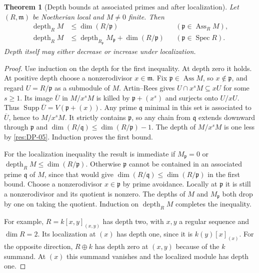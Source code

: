 \documentclass[11pt,oneside,openany]{book}
\newtheorem{theorem}{Theorem}[chapter]
\theoremstyle{definition}
\theoremstyle{remark}
\begin{document}
\begin{theorem}[Depth bounds at associated primes and after localization]
\label{res:DP-10}
Let $(R,\mathfrak m)$ be Noetherian local and $M\ne0$ finite. Then
\[
 \begin{aligned}
 \operatorname{depth}_R M &\le \dim(R/\mathfrak p)
           &&(\mathfrak p\in\operatorname{Ass}_R M),\\
 \operatorname{depth}_R M &\le \operatorname{depth}_{R_{\mathfrak p}}M_{\mathfrak p}
                                      +\dim(R/\mathfrak p)
           &&(\mathfrak p\in\operatorname{Spec}R).
 \end{aligned}
\]
Depth itself may either decrease or increase under localization.
\end{theorem}
\begin{proof}
Use induction on the depth for the first inequality. At depth zero
it holds. At positive depth choose a nonzerodivisor $x\in\mathfrak m$.
Fix $\mathfrak p\in\operatorname{Ass}M$, so $x\notin\mathfrak p$,
and regard $U=R/\mathfrak p$ as a submodule of $M$. Artin--Rees
\cite[Theorem ALG-05-C04-R02]{p103} gives
$U\cap x^s M\subseteq xU$ for some $s\ge1$. Its image
$\overline U$ in $M/x^sM$ is killed by $\mathfrak p+(x^s)$
and surjects onto $U/xU$. Thus
$\operatorname{Supp}\overline U=V(\mathfrak p+(x))$.
Any prime $\mathfrak q$ minimal in this set is associated to
$\overline U$, hence to $M/x^sM$. It strictly contains $\mathfrak p$,
so any chain from $\mathfrak q$ extends downward through
$\mathfrak p$ and $\dim(R/\mathfrak q)\le\dim(R/\mathfrak p)-1$.
The depth of $M/x^sM$ is one less by \ref{res:DP-05}.
Induction proves the first bound.

For the localization inequality the result is immediate if
$M_{\mathfrak p}=0$ or
$\operatorname{depth}_R M\le\dim(R/\mathfrak p)$.
Otherwise $\mathfrak p$ cannot be contained in an associated
prime $\mathfrak q$ of $M$, since that would give
$\dim(R/\mathfrak q)\le\dim(R/\mathfrak p)$ in the first bound.
Choose a nonzerodivisor $x\in\mathfrak p$ by prime avoidance.
Locally at $\mathfrak p$ it is still a nonzerodivisor and its
quotient is nonzero. The depths of $M$ and $M_{\mathfrak p}$
both drop by one on taking the quotient. Induction on
$\operatorname{depth}_R M$ completes the inequality.

For example, $R=k[x,y]_{(x,y)}$ has depth two, with $x,y$ a
regular sequence and $\dim R=2$. Its localization at $(x)$ has
depth one, since it is $k(y)[x]_{(x)}$. For the opposite direction,
$R\oplus k$ has depth zero at $(x,y)$ because of the $k$ summand.
At $(x)$ this summand vanishes and the localized module has depth one.
\end{proof}
\end{document}
